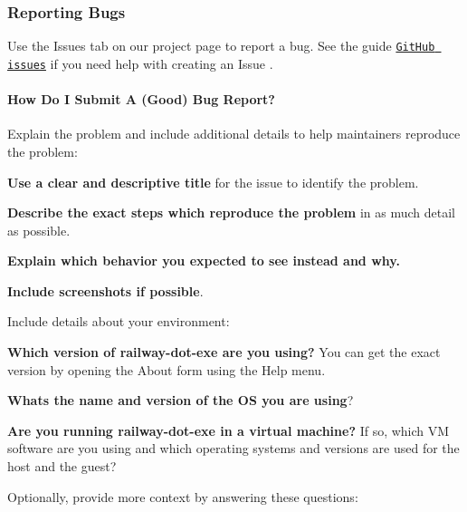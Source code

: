 \subsubsection*{Reporting Bugs}

Use the Issues tab on our project page to report a bug. See the guide \href{https://guides.github.com/features/issues/}{\tt Git\+Hub issues} if you need help with creating an Issue .

\paragraph*{How Do I Submit A (Good) Bug Report?}

Explain the problem and include additional details to help maintainers reproduce the problem\+:


\begin{DoxyItemize}
\item {\bfseries Use a clear and descriptive title} for the issue to identify the problem.
\item {\bfseries Describe the exact steps which reproduce the problem} in as much detail as possible.
\item {\bfseries Explain which behavior you expected to see instead and why.}
\item {\bfseries Include screenshots if possible}.
\end{DoxyItemize}

Include details about your environment\+:


\begin{DoxyItemize}
\item {\bfseries Which version of railway-\/dot-\/exe are you using?} You can get the exact version by opening the About form using the Help menu.
\item {\bfseries What\textquotesingle{}s the name and version of the OS you are using}?
\item {\bfseries Are you running railway-\/dot-\/exe in a virtual machine?} If so, which VM software are you using and which operating systems and versions are used for the host and the guest?
\end{DoxyItemize}

Optionally, provide more context by answering these questions\+:


